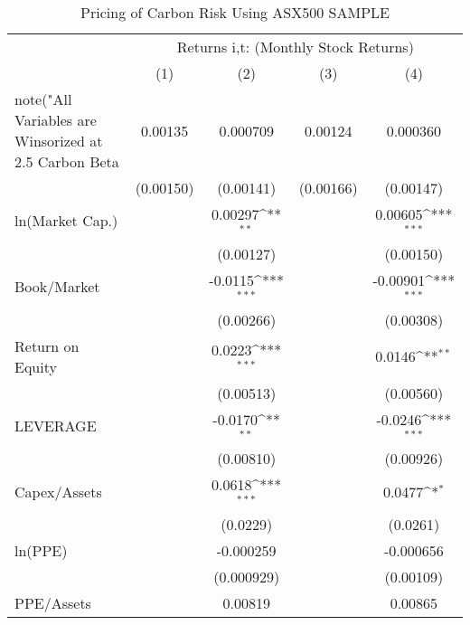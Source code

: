 \begin{table}[htbp]\centering
\def\sym#1{\ifmmode^{#1}\else\(^{#1}\)\fi}
\caption{Pricing of Carbon Risk Using ASX500 SAMPLE}
\begin{tabular}{l*{4}{c}}
\hline\hline
                &\multicolumn{4}{c}{Returns i,t: (Monthly Stock Returns) }                  \\\cmidrule(lr){2-5}
                &\multicolumn{1}{c}{(1)}         &\multicolumn{1}{c}{(2)}         &\multicolumn{1}{c}{(3)}         &\multicolumn{1}{c}{(4)}         \\
note("All
Variables
are
Winsorized
at
2.5%
Carbon Beta     &  0.00135         & 0.000709         &  0.00124         & 0.000360         \\
                &(0.00150)         &(0.00141)         &(0.00166)         &(0.00147)         \\
ln(Market Cap.) &                  &  0.00297\sym{**} &                  &  0.00605\sym{***}\\
                &                  &(0.00127)         &                  &(0.00150)         \\
Book/Market     &                  &  -0.0115\sym{***}&                  & -0.00901\sym{***}\\
                &                  &(0.00266)         &                  &(0.00308)         \\
Return on Equity&                  &   0.0223\sym{***}&                  &   0.0146\sym{**} \\
                &                  &(0.00513)         &                  &(0.00560)         \\
LEVERAGE        &                  &  -0.0170\sym{**} &                  &  -0.0246\sym{***}\\
                &                  &(0.00810)         &                  &(0.00926)         \\
Capex/Assets    &                  &   0.0618\sym{***}&                  &   0.0477\sym{*}  \\
                &                  & (0.0229)         &                  & (0.0261)         \\
ln(PPE)         &                  &-0.000259         &                  &-0.000656         \\
                &                  &(0.000929)         &                  &(0.00109)         \\
PPE/Assets      &                  &  0.00819         &                  &  0.00865         \\

\end{tabular}
\end{table}
